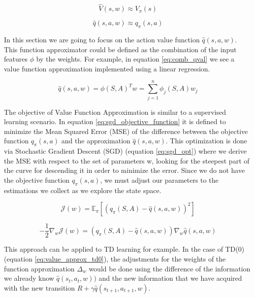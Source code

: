 \begin{equation}\label{eq:value_aprox}
	\hat{V}(s,w) \approx V_{\pi}(s)
\end{equation}

\begin{equation}\label{eq:q_value_aprox}
	\hat{q}(s,a,w) \approx q_{\pi}(s,a)
\end{equation}

In this section we are going to focus on the action value function $\hat{q}(s,a,w)$. This function approximator could be defined as the combination of the input features $\phi$ by the weights. For example, in equation \ref{eq:comb_qval} we see a value function approximation implemented using a linear regression.

\begin{equation} \label{eq:comb_qval}
	\hat{q}(s,a,w) = \phi(S,A)^T w = \sum_{j=1}^{n}\phi_{j}(S,A) w_j
\end{equation}

The objective of Value Function Approximation is similar to a supervised learning scenario. In equation \ref{eq:sgd_objective_function} it is defined to minimize the Mean Squared Error (MSE) of the difference between the objective function $q_{\pi}(s,a)$ and the approximation $\hat{q}(s,a,w)$. This optimization is done via Stochastic Gradient Descent (SGD) (equation \ref{eq:sgd_opt}) where we derive the MSE with respect to the set of parameters w, looking for the steepest part of the curve for descending it in order to minimize the error. Since we do not have the objective function $q_{\pi}(s,a)$, we must adjust our parameters to the estimations we collect as we explore the state space.

\begin{equation} \label{eq:sgd_objective_function}
	\mathcal{J}(w) = \mathbb{E}_{\pi}[(q_{\pi}(S,A) - \hat{q}(s,a,w))^2 ]
\end{equation}

\begin{equation} \label{eq:sgd_opt}
	-\frac{1}{2} \nabla_{w} \mathcal{J}(w) = (q_{\pi}(S,A) - \hat{q}(s,a,w)) \nabla_{w}\hat{q}(s,a,w)
\end{equation}

This approach can be applied to TD learning for example. In the case of TD(0) (equation \ref{eq:value_approx_td0}), the adjustments for the weights of the function approximation $\Delta_{w}$ would be done using the difference of the information we already know $\hat{q}(s_{t},a_{t},w))$ and the new information that we have acquired with the new transition $R + \gamma \hat{q}(s_{t+1},a_{t+1},w)$.

